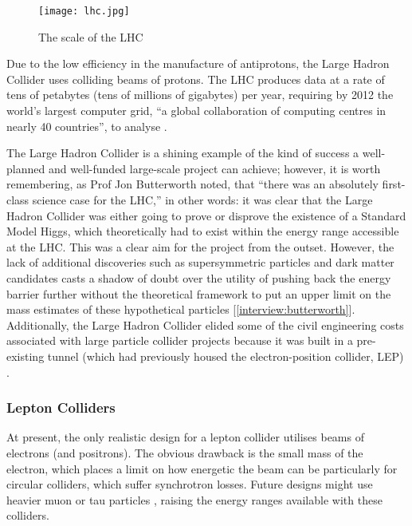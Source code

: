 \begin{figure}[!htb]
\centering
\texttt{[image: lhc.jpg]}
\caption{The scale of the LHC \cite{ATLAS:Gallery:Online}}
\end{figure}

Due to the low efficiency in the manufacture of antiprotons, the Large Hadron Collider uses colliding beams of protons. The LHC produces data at a rate of tens of petabytes (tens of millions of gigabytes) per year, requiring \textendash by 2012 \textendash the world's largest computer grid, ``a global collaboration of computing centres in nearly 40 countries'', to analyse \cite{LHC:ComputingGrid:Online}.

The Large Hadron Collider is a shining example of the kind of success a well-planned and well-funded large-scale project can achieve; however, it is worth remembering, as Prof Jon Butterworth noted, that ``there was an absolutely first-class science case for the LHC,'' \textendash in other words: it was clear that the Large Hadron Collider was either going to prove or disprove the existence of a Standard Model Higgs, which theoretically had to exist within the energy range accessible at the LHC. This was a clear aim for the project from the outset. However, the lack of additional discoveries \textendash such as supersymmetric particles and dark matter candidates \textendash casts a shadow of doubt over the utility of pushing back the energy barrier further without the theoretical framework to put an upper limit on the mass estimates of these hypothetical particles [\ref{interview:butterworth}]. Additionally, the Large Hadron Collider elided some of the civil engineering costs associated with large particle collider projects because it was built in a pre-existing tunnel (which had previously housed the electron-position collider, LEP) \cite{CERN:LEP:Online}.

\subsubsection{Lepton Colliders}
At present, the only realistic design for a lepton collider utilises beams of electrons (and positrons). The obvious drawback is the small mass of the electron, which places a limit on how energetic the beam can be \textendash particularly for circular colliders, which suffer synchrotron losses. Future designs might use heavier muon or tau particles \cite{Fermi:Muon:Online}, raising the energy ranges available with these colliders.

